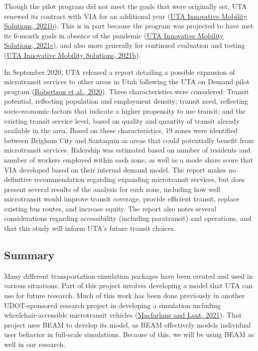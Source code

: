 \documentclass[
]{article}
\begin{document}
Though the pilot program did not meet the goals that were originally set, UTA renewed its contract with VIA for an additional year (\protect\hyperlink{ref-UTAevalQ3}{UTA Innovative Mobility Solutions, 2021b}). This is in part because the program was projected to have met its 6-month goals in absence of the pandemic (\protect\hyperlink{ref-UTAevalQ2}{UTA Innovative Mobility Solutions, 2021c}), and also more generally for continued evaluation and testing (\protect\hyperlink{ref-UTAevalQ3}{UTA Innovative Mobility Solutions, 2021b}).

In September 2020, UTA released a report detailing a possible expansion of microtransit services to other areas in Utah following the UTA on Demand pilot program (\protect\hyperlink{ref-UTAreport}{Robertson et al., 2020}). Three characteristics were considered: Transit potential, reflecting population and employment density; transit need, reflecting socio-economic factors that indicate a higher propensity to use transit; and the existing transit service level, based on quality and quantity of transit already available in the area. Based on these characteristics, 19 zones were identified between Brigham City and Santaquin as areas that could potentially benefit from microtransit services. Ridership was estimated based on number of residents and number of workers employed within each zone, as well as a mode share score that VIA developed based on their internal demand model. The report makes no definitive recommendation regarding expanding microtransit services, but does present several results of the analysis for each zone, including how well microtransit would improve transit coverage, provide efficient transit, replace existing bus routes, and increase equity. The report also notes several considerations regarding accessibility (including paratransit) and operations, and that this study will inform UTA's future transit choices.

\hypertarget{summary}{%
\subsection{Summary}\label{summary}}

Many different transportation simulation packages have been created and used in various situations. Part of this project involves developing a model that UTA can use for future research. Much of this work has been done previously in another UDOT-sponsored research project in developing a simulation including wheelchair-accessible microtransit vehicles (\protect\hyperlink{ref-MacfarlaneLant}{Macfarlane and Lant, 2021}). That project uses BEAM to develop its model, as BEAM effectively models individual user behavior in full-scale simulations. Because of this, we will be using BEAM as well in our research.
\end{document}
